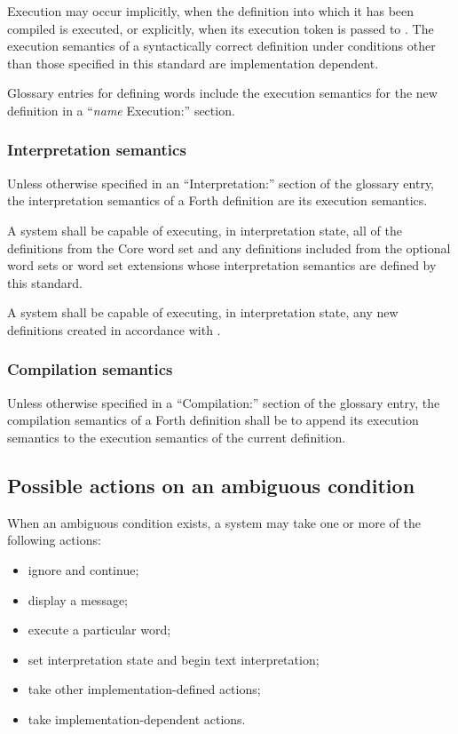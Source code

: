 Execution may occur implicitly, when the definition into which it
has been compiled is executed, or explicitly, when its execution
token is passed to . The execution semantics of a
syntactically correct definition under conditions other than those
specified in this standard are implementation dependent.

Glossary entries for defining words include the execution semantics
for the new definition in a ``\emph{name} \textsf{Execution:}''
section.

\subsubsection{Interpretation semantics} %
\label{usage:interpret}

Unless otherwise specified in an ``\textsf{Interpretation:}''
section of the glossary entry, the interpretation semantics of a
Forth definition are its execution semantics.

A system shall be capable of executing, in interpretation state,
all of the definitions from the Core word set and any definitions
included from the optional word sets or word set extensions whose
interpretation semantics are defined by this standard.

A system shall be capable of executing, in interpretation state,
any new definitions created in accordance with
.

\subsubsection{Compilation semantics} %
\label{usage:compile}

Unless otherwise specified in a ``\textsf{Compilation:}'' section
of the glossary entry, the compilation semantics of a Forth
definition shall be to append its execution semantics to the
execution semantics of the current definition.


\subsection{Possible actions on an ambiguous condition} %
\label{usage:ambiguous}

When an ambiguous condition exists, a system may take one or more
of the following actions:

\begin{itemize}
\item ignore and continue;
\item display a message;
\item execute a particular word;
\item set interpretation state and begin text interpretation;
\item take other implementation-defined actions;
\item take implementation-dependent actions.
\end{itemize}

